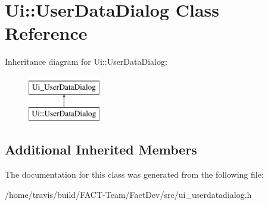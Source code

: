 \hypertarget{classUi_1_1UserDataDialog}{\section{Ui\-:\-:User\-Data\-Dialog Class Reference}
\label{classUi_1_1UserDataDialog}
}
Inheritance diagram for Ui\-:\-:User\-Data\-Dialog\-:\begin{figure}[H]
\begin{center}
\leavevmode
\includegraphics[height=2.000000cm]{d0/d73/classUi_1_1UserDataDialog}
\end{center}
\end{figure}
\subsection*{Additional Inherited Members}


The documentation for this class was generated from the following file\-:\begin{DoxyCompactItemize}
\item 
/home/travis/build/\-F\-A\-C\-T-\/\-Team/\-Fact\-Dev/src/ui\-\_\-userdatadialog.\-h\end{DoxyCompactItemize}
